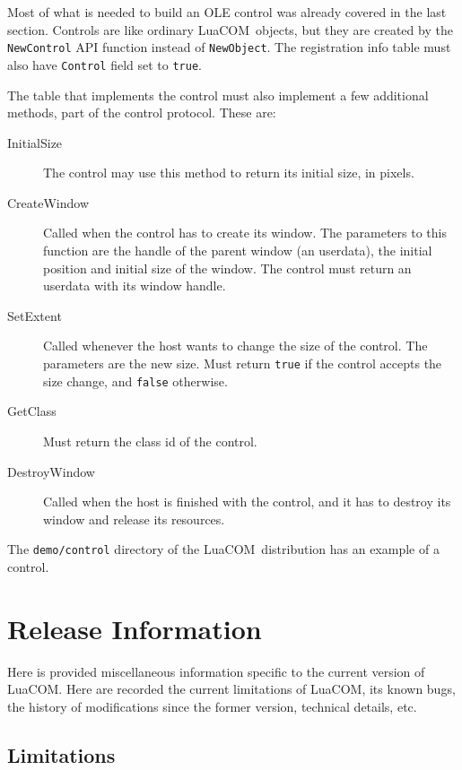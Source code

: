 \documentclass[11pt,a4paper,english]{report}
\newcommand{\techname}[1]{\mbox{#1}}
\newcommand{\luacom}{\techname{LuaCOM}}
\begin{document}
Most of what is needed to build an OLE control was already covered
in the last section. Controls are like ordinary \luacom\ objects,
but they are created by the \verb+NewControl+ API function instead
of \verb+NewObject+. The registration info table must also have
\verb+Control+ field set to \verb+true+.

The table that implements the control must also implement a few
additional methods, part of the control protocol. These are:

\begin{description}
\item[InitialSize] The control may use this method to return its
 initial size, in pixels.
\item[CreateWindow] Called when the control has to create its
window. The parameters to this function are the handle of the parent
window (an userdata), the initial position and initial size of the
window. The control must return an userdata with its window handle.
\item[SetExtent] Called whenever the host wants to change the size
of the control. The parameters are the new size. Must return
\verb+true+ if the control accepts the size change, and \verb+false+
otherwise.
\item[GetClass] Must return the class id of the control.
\item[DestroyWindow] Called when the host is finished with the control, and
it has to destroy its window and release its resources.
\end{description}

The \verb+demo/control+ directory of the \luacom\ distribution has
an example of a control.


\chapter{Release Information}
\label{chap:release}

Here is provided miscellaneous information specific to the current
version of \luacom. Here are recorded the current limitations of
\luacom, its known bugs, the history of modifications since the former
version, technical details, etc.

\section{Limitations}
\label{sect:limitations}
\end{document}
